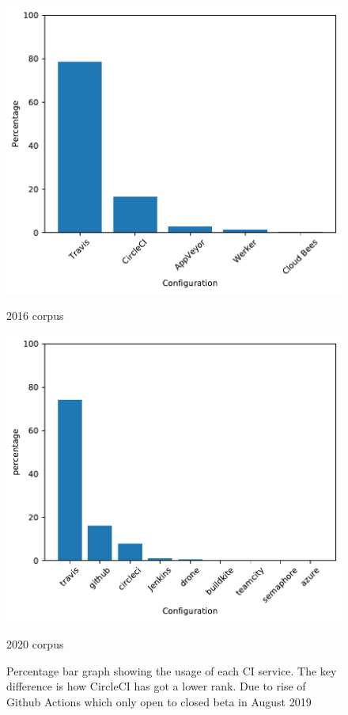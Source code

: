 \documentclass[twoside,12pt,titlepage,a4paper]{article}
\begin{document}
\begin{figure}[!htbp]
  \centering
  \begin{minipage}{.48\textwidth}
    \centering
    \includegraphics[width=\textwidth]{../src/results/comparison_config_bar.pdf}
    \caption[]{2016 corpus}
    \label{graph:config_bar2016}
  \end{minipage}
  \begin{minipage}{.48\textwidth}
    \centering
  \includegraphics[width=\textwidth]{../src/results/config-topn.pdf}
  \caption[]{2020 corpus}
  \label{graph:config_bar2020}
  \end{minipage}
  \caption[]{Percentage bar graph showing the usage of each CI service. The key difference is how CircleCI has got a lower rank. Due to rise of Github Actions which only open to closed beta in August 2019}
  \label{graph:config_bars}

\end{figure}
\end{document}

